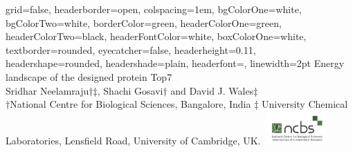 \documentclass[a0paper,portrait]{baposter}
\begin{document}
\begin{poster}
{
grid=false,
headerborder=open, %
colspacing=1em, %
bgColorOne=white, %
bgColorTwo=white, %
borderColor=green, %
headerColorOne=green, %
headerColorTwo=black, %
headerFontColor=white, %
boxColorOne=white, %
textborder=rounded, %
eyecatcher=false, %
headerheight=0.11\textheight, %
headershape=rounded, %
headershade=plain,
headerfont=\Large\textsf, %
linewidth=2pt %
}
{}
%
%
{
\textsf %
{Energy landscape of the designed protein Top7
}
}
{\sf\vspace{0.2em}\\
Sridhar Neelamraju$\dagger$$\ddagger$, Shachi Gosavi$\dagger$ and David J. Wales$\ddagger$
\vspace{-0.1em}\\
\small{$\dagger$National Centre for Biological Sciences, Bangalore, India $\ddagger$ University Chemical Laboratories, Lensfield Road, University of Cambridge, UK.
\vspace{0.2em}}
}
{\includegraphics[height=0.5in, width=1in]{logo_ncbs.jpg}} %
	


\end{poster}
\end{document}
